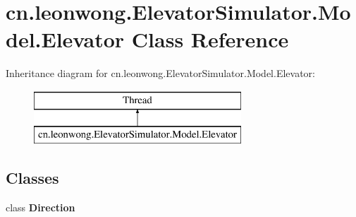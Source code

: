\hypertarget{classcn_1_1leonwong_1_1_elevator_simulator_1_1_model_1_1_elevator}{}\section{cn.\+leonwong.\+Elevator\+Simulator.\+Model.\+Elevator Class Reference}
\label{classcn_1_1leonwong_1_1_elevator_simulator_1_1_model_1_1_elevator}
Inheritance diagram for cn.\+leonwong.\+Elevator\+Simulator.\+Model.\+Elevator\+:\begin{figure}[H]
\begin{center}
\leavevmode
\includegraphics[height=2.000000cm]{classcn_1_1leonwong_1_1_elevator_simulator_1_1_model_1_1_elevator}
\end{center}
\end{figure}
\subsection*{Classes}
\begin{DoxyCompactItemize}
\item 
class {\bfseries Direction}
\end{DoxyCompactItemize}
